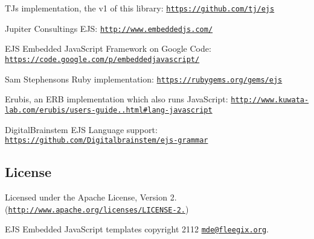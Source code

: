 \begin{DoxyItemize}
\item TJ\textquotesingle{}s implementation, the v1 of this library\+: \href{https://github.com/tj/ejs}{\tt https\+://github.\+com/tj/ejs}
\item Jupiter Consulting\textquotesingle{}s E\+JS\+: \href{http://www.embeddedjs.com/}{\tt http\+://www.\+embeddedjs.\+com/}
\item E\+JS Embedded Java\+Script Framework on Google Code\+: \href{https://code.google.com/p/embeddedjavascript/}{\tt https\+://code.\+google.\+com/p/embeddedjavascript/}
\item Sam Stephenson\textquotesingle{}s Ruby implementation\+: \href{https://rubygems.org/gems/ejs}{\tt https\+://rubygems.\+org/gems/ejs}
\item Erubis, an E\+RB implementation which also runs Java\+Script\+: \href{http://www.kuwata-lab.com/erubis/users-guide.04.html#lang-javascript}{\tt http\+://www.\+kuwata-\/lab.\+com/erubis/users-\/guide..\+html\#lang-\/javascript}
\item Digital\+Brainstem E\+JS Language support\+: \href{https://github.com/Digitalbrainstem/ejs-grammar}{\tt https\+://github.\+com/\+Digitalbrainstem/ejs-\/grammar}
\end{DoxyItemize}

\subsection*{License}

Licensed under the Apache License, Version 2. (\href{http://www.apache.org/licenses/LICENSE-2.0}{\tt http\+://www.\+apache.\+org/licenses/\+L\+I\+C\+E\+N\+S\+E-\/2.})



 E\+JS Embedded Java\+Script templates copyright 2112 \href{mailto:mde@fleegix.org}{\tt mde@fleegix.\+org}. 